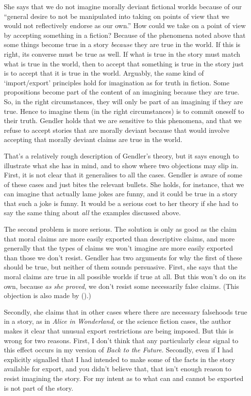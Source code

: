 \documentclass[
  11pt,
  letterpaper,
  DIV=11,
  numbers=noendperiod,
  twoside]{scrartcl}
\begin{document}
She says that we do not imagine morally deviant fictional worlds because
of our ``general desire to not be manipulated into taking on points of
view that we would not reflectively endorse as our own.'' How could we
take on a point of view by accepting something in a fiction? Because of
the phenomena noted above that some things become true in a story
\emph{because} they are true in the world. If this is right, its
converse must be true as well. If what is true in the story must match
what is true in the world, then to accept that something is true in the
story just is to accept that it is true in the world. Arguably, the same
kind of `import/export' principles hold for imagination as for truth in
fiction. Some propositions become part of the content of an imagining
because they are true. So, in the right circumstances, they will only be
part of an imagining if they are true. Hence to imagine them (in the
right circumstances) is to commit oneself to their truth. Gendler holds
that we are sensitive to this phenomena, and that we refuse to accept
stories that are morally deviant because that would involve accepting
that morally deviant claims are true in the world.

That's a relatively rough description of Gendler's theory, but it says
enough to illustrate what she has in mind, and to show where two
objections may slip in. First, it is not clear that it generalises to
all the cases. Gendler is aware of some of these cases and just bites
the relevant bullets. She holds, for instance, that we can imagine that
actually lame jokes are funny, and it could be true in a story that such
a joke is funny. It would be a serious cost to her theory if she had to
say the same thing about \emph{all} the examples discussed above.

The second problem is more serious. The solution is only as good as the
claim that moral claims are more easily exported than descriptive
claims, and more generally that the types of claims we won't imagine are
more easily exported than those we don't resist. Gendler has two
arguments for why the first of these should be true, but neither of them
sounds persuasive. First, she says that the moral claims are true in all
possible worlds if true at all. But this won't do on its own, because
\emph{as she proved}, we don't resist some necessarily false claims.
(This objection is also made by ().)

Secondly, she claims that in other cases where there are necessary
falsehoods true in a story, as in \emph{Alice in Wonderland}, or the
science fiction cases, the author makes it clear that unusual export
restrictions are being imposed. But this is wrong for two reasons.
First, I don't think that any particularly clear signal to this effect
occurs in my version of \emph{Back to the Future}. Secondly, even if I
had explicitly signalled that I had intended to make some of the facts
in the story available for export, and you didn't believe that, that
isn't enough reason to resist imagining the story. For my intent as to
what can and cannot be exported is not part of the story.
\end{document}
